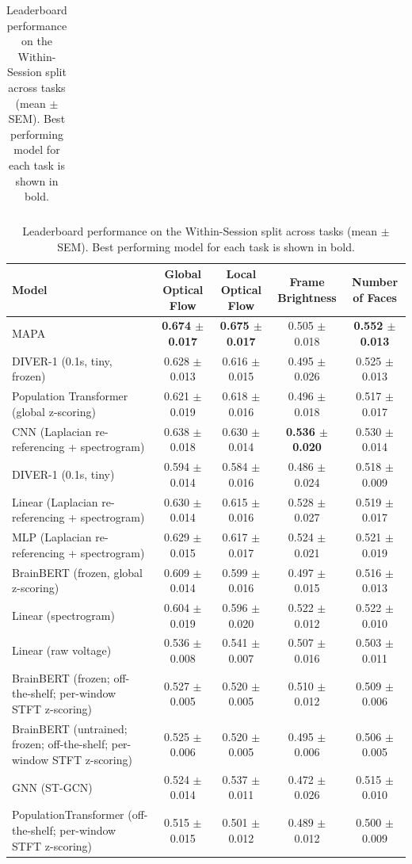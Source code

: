 \begin{table}[!htbp]
\begin{tabular}{>{\raggedright\arraybackslash}p{8cm}cccc}
\hline
\end{tabular}
\hspace{1em}
\hspace*{-2.5cm}\begin{tabular}{>{\raggedright\arraybackslash}p{8cm}cccc}
\hline
Model & Global Optical Flow & Local Optical Flow & Frame Brightness & Number of Faces \\
\hline
MAPA & \textbf{0.674 $\pm$ 0.017} & \textbf{0.675 $\pm$ 0.017} & 0.505 $\pm$ 0.018 & \textbf{0.552 $\pm$ 0.013} \\
DIVER-1 (0.1s, tiny, frozen) & 0.628 $\pm$ 0.013 & 0.616 $\pm$ 0.015 & 0.495 $\pm$ 0.026 & 0.525 $\pm$ 0.013 \\
Population Transformer (global z-scoring) & 0.621 $\pm$ 0.019 & 0.618 $\pm$ 0.016 & 0.496 $\pm$ 0.018 & 0.517 $\pm$ 0.017 \\
CNN (Laplacian re-referencing + spectrogram) & 0.638 $\pm$ 0.018 & 0.630 $\pm$ 0.014 & \textbf{0.536 $\pm$ 0.020} & 0.530 $\pm$ 0.014 \\
DIVER-1 (0.1s, tiny) & 0.594 $\pm$ 0.014 & 0.584 $\pm$ 0.016 & 0.486 $\pm$ 0.024 & 0.518 $\pm$ 0.009 \\
Linear (Laplacian re-referencing + spectrogram) & 0.630 $\pm$ 0.014 & 0.615 $\pm$ 0.016 & 0.528 $\pm$ 0.027 & 0.519 $\pm$ 0.017 \\
MLP (Laplacian re-referencing + spectrogram) & 0.629 $\pm$ 0.015 & 0.617 $\pm$ 0.017 & 0.524 $\pm$ 0.021 & 0.521 $\pm$ 0.019 \\
BrainBERT (frozen, global z-scoring) & 0.609 $\pm$ 0.014 & 0.599 $\pm$ 0.016 & 0.497 $\pm$ 0.015 & 0.516 $\pm$ 0.013 \\
Linear (spectrogram) & 0.604 $\pm$ 0.019 & 0.596 $\pm$ 0.020 & 0.522 $\pm$ 0.012 & 0.522 $\pm$ 0.010 \\
Linear (raw voltage) & 0.536 $\pm$ 0.008 & 0.541 $\pm$ 0.007 & 0.507 $\pm$ 0.016 & 0.503 $\pm$ 0.011 \\
BrainBERT (frozen; off-the-shelf; per-window STFT z-scoring) & 0.527 $\pm$ 0.005 & 0.520 $\pm$ 0.005 & 0.510 $\pm$ 0.012 & 0.509 $\pm$ 0.006 \\
BrainBERT (untrained; frozen; off-the-shelf; per-window STFT z-scoring) & 0.525 $\pm$ 0.006 & 0.520 $\pm$ 0.005 & 0.495 $\pm$ 0.006 & 0.506 $\pm$ 0.005 \\
GNN (ST-GCN) & 0.524 $\pm$ 0.014 & 0.537 $\pm$ 0.011 & 0.472 $\pm$ 0.026 & 0.515 $\pm$ 0.010 \\
PopulationTransformer (off-the-shelf; per-window STFT z-scoring) & 0.515 $\pm$ 0.015 & 0.501 $\pm$ 0.012 & 0.489 $\pm$ 0.012 & 0.500 $\pm$ 0.009 \\
\hline
\end{tabular}
\caption{Leaderboard performance on the Within-Session split across tasks (mean $\pm$ SEM). Best performing model for each task is shown in bold.}
\label{tab:leaderboard_performance_WithinSession}
\end{table}